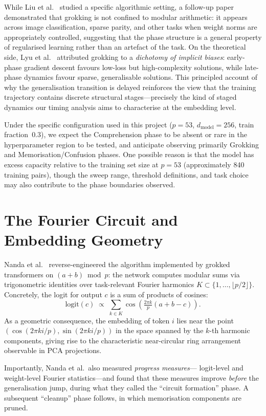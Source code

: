 \documentclass[12pt,openany,a4paper]{book}
\begin{document}
While Liu et al.\ \cite{liu2022towards} studied a specific algorithmic setting,
a follow-up paper \cite{liu2023omnigrok} demonstrated that grokking is not
confined to modular arithmetic: it appears across image classification,
sparse parity, and other tasks when weight norms are appropriately
controlled, suggesting that the phase structure is a general property
of regularised learning rather than an artefact of the task.
On the theoretical side, Lyu et al.\ \cite{lyu2024dichotomy} attributed
grokking to a \emph{dichotomy of implicit biases}: early-phase gradient
descent favours low-loss but high-complexity solutions, while late-phase
dynamics favour sparse, generalisable solutions.
This principled account of why the generalisation transition is delayed
reinforces the view that the training trajectory contains discrete
structural stages---precisely the kind of staged dynamics our timing
analysis aims to characterise at the embedding level.

Under the specific configuration used in this project ($p=53$,
$d_{\mathrm{model}}=256$, train fraction~$0.3$), we expect
the Comprehension phase to be absent or rare in the hyperparameter
region to be tested, and anticipate observing primarily Grokking
and Memorisation/Confusion phases.
One possible reason is that the model has excess capacity relative
to the training set size at $p=53$ (approximately 840 training
pairs), though the sweep range, threshold definitions, and task
choice may also contribute to the phase boundaries observed.

\section{The Fourier Circuit and Embedding Geometry}

Nanda et al.\ \cite{nanda2023progress} reverse-engineered the
algorithm implemented by grokked transformers on $(a+b)\bmod p$:
the network computes modular sums via trigonometric identities
over task-relevant Fourier harmonics $K\subset\{1,\dots,\lfloor
p/2\rfloor\}$.
Concretely, the logit for output $c$ is a sum of products of cosines:
\[
  \mathrm{logit}(c) \;\propto\; \sum_{k\in K}
    \cos\!\left(\tfrac{2\pi k}{p}(a+b-c)\right).
\]
As a geometric consequence, the embedding of token $i$ lies near
the point $(\cos(2\pi ki/p),\sin(2\pi ki/p))$ in the space spanned
by the $k$-th harmonic components, giving rise to the characteristic
near-circular ring arrangement observable in PCA projections.

Importantly, Nanda et al.\ also measured \emph{progress measures}---
logit-level and weight-level Fourier statistics---and found that these
measures improve \emph{before} the generalisation jump, during what
they called the ``circuit formation'' phase.
A subsequent ``cleanup'' phase follows, in which memorisation
components are pruned.
\end{document}

